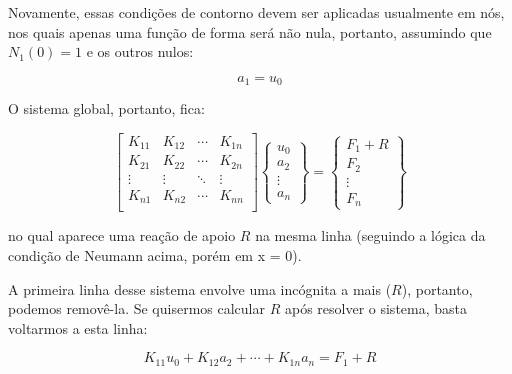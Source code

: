         Novamente, essas condições de contorno devem ser aplicadas usualmente em nós, nos quais apenas uma função de forma será não nula, portanto, assumindo que $N_1(0) = 1$ e os outros nulos:

        \begin{equation*}
            a_1 = u_0
        \end{equation*}

        O sistema global, portanto, fica:

        \begin{equation*}
             \begin{bmatrix}
                K_{11} & K_{12} & \cdots & K_{1n}\\
                K_{21} & K_{22} & \cdots & K_{2n}\\
                \vdots & \vdots & \ddots & \vdots\\
                K_{n1} & K_{n2} & \cdots & K_{nn}\\
            \end{bmatrix}
            \begin{Bmatrix}
                u_0 \\ 
                a_2 \\
                \vdots\\
                a_n
            \end{Bmatrix}
            =
             \begin{Bmatrix}
                F_1 + R\\
                F_2\\
                \vdots\\
                F_n
            \end{Bmatrix}
        \end{equation*}

        \noindent no qual aparece uma reação de apoio $R$ na mesma linha (seguindo a lógica da condição de Neumann acima, porém em x = 0).

        A primeira linha desse sistema envolve uma incógnita a mais ($R$), portanto, podemos removê-la. Se quisermos calcular $R$ após resolver o sistema, basta voltarmos a esta linha:

        \begin{equation*}
            K_{11}u_0  + K_{12}a_2 + \cdots + K_{1n}a_n = F_1 + R
        \end{equation*}

